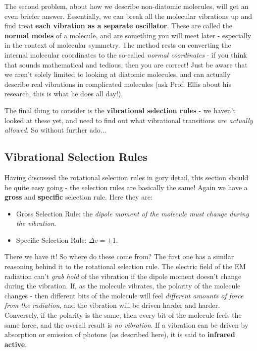 \documentclass{memoir}[11pt,oneside,a4paper,openany]
\begin{document}
The second problem, about how we describe non-diatomic molecules, will get an even briefer answer. Essentially, we can break all the molecular vibrations up and find treat \textbf{each vibration as a separate oscillator}. These are called the \textbf{normal modes} of a molecule, and are something you will meet later - especially in the context of molecular symmetry. The method rests on converting the internal molecular coordinates to the so-called \emph{normal coordinates} - if you think that sounds mathematical and tedious, then you are correct! Just be aware that we aren't solely limited to looking at diatomic molecules, and can actually describe real vibrations in complicated molecules (ask Prof. Ellis about his research, this is what he does all day!).

The final thing to consider is the \textbf{vibrational selection rules} - we haven't looked at these yet, and need to find out what vibrational transitions \emph{are actually allowed}. So without further ado...

\subsection{Vibrational Selection Rules}
Having discussed the rotational selection rules in gory detail, this section should be quite easy going - the selection rules are basically the same! Again we have a \textbf{gross} and \textbf{specific} selection rule. Here they are:
\begin{itemize}
	\item Gross Selection Rule: the \emph{dipole moment of the molecule \emph{must} change during the vibration}.
	\item Specific Selection Rule: $\Delta v = \pm 1$.
\end{itemize}
There we have it! So where do these come from? The first one has a similar reasoning behind it to the rotational selection rule. The electric field of the EM radiation can't \emph{grab hold} of the vibration if the dipole moment doesn't change during the vibration. If, as the molecule vibrates, the polarity of the molecule changes - then different bits of the molecule will feel \emph{different amounts of force from the radiation}, and the vibration will be driven harder and harder. Conversely, if the polarity is the same, then every bit of the molecule feels the same force, and the overall result is \emph{no vibration}. If a vibration can be driven by absorption or emission of photons (as described here), it is said to \textbf{infrared active}. 
\end{document}

